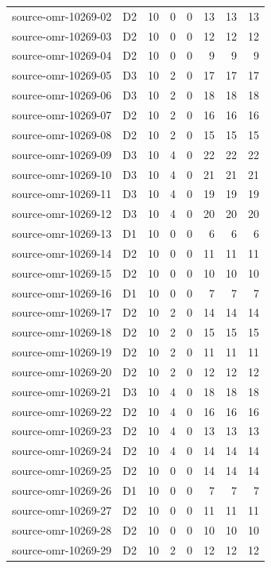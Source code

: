 \begin{longtable}{llrrrrrr}
source-omr-10269-02 & D2 & 10 & 0 & 0 & 13 & 13 & 13\\
source-omr-10269-03 & D2 & 10 & 0 & 0 & 12 & 12 & 12\\
source-omr-10269-04 & D2 & 10 & 0 & 0 & 9 & 9 & 9\\
source-omr-10269-05 & D3 & 10 & 2 & 0 & 17 & 17 & 17\\
source-omr-10269-06 & D3 & 10 & 2 & 0 & 18 & 18 & 18\\
source-omr-10269-07 & D2 & 10 & 2 & 0 & 16 & 16 & 16\\
source-omr-10269-08 & D2 & 10 & 2 & 0 & 15 & 15 & 15\\
source-omr-10269-09 & D3 & 10 & 4 & 0 & 22 & 22 & 22\\
source-omr-10269-10 & D3 & 10 & 4 & 0 & 21 & 21 & 21\\
source-omr-10269-11 & D3 & 10 & 4 & 0 & 19 & 19 & 19\\
source-omr-10269-12 & D3 & 10 & 4 & 0 & 20 & 20 & 20\\
source-omr-10269-13 & D1 & 10 & 0 & 0 & 6 & 6 & 6\\
source-omr-10269-14 & D2 & 10 & 0 & 0 & 11 & 11 & 11\\
source-omr-10269-15 & D2 & 10 & 0 & 0 & 10 & 10 & 10\\
source-omr-10269-16 & D1 & 10 & 0 & 0 & 7 & 7 & 7\\
source-omr-10269-17 & D2 & 10 & 2 & 0 & 14 & 14 & 14\\
source-omr-10269-18 & D2 & 10 & 2 & 0 & 15 & 15 & 15\\
source-omr-10269-19 & D2 & 10 & 2 & 0 & 11 & 11 & 11\\
source-omr-10269-20 & D2 & 10 & 2 & 0 & 12 & 12 & 12\\
source-omr-10269-21 & D3 & 10 & 4 & 0 & 18 & 18 & 18\\
source-omr-10269-22 & D2 & 10 & 4 & 0 & 16 & 16 & 16\\
source-omr-10269-23 & D2 & 10 & 4 & 0 & 13 & 13 & 13\\
source-omr-10269-24 & D2 & 10 & 4 & 0 & 14 & 14 & 14\\
source-omr-10269-25 & D2 & 10 & 0 & 0 & 14 & 14 & 14\\
source-omr-10269-26 & D1 & 10 & 0 & 0 & 7 & 7 & 7\\
source-omr-10269-27 & D2 & 10 & 0 & 0 & 11 & 11 & 11\\
source-omr-10269-28 & D2 & 10 & 0 & 0 & 10 & 10 & 10\\
source-omr-10269-29 & D2 & 10 & 2 & 0 & 12 & 12 & 12\\

\end{longtable}
